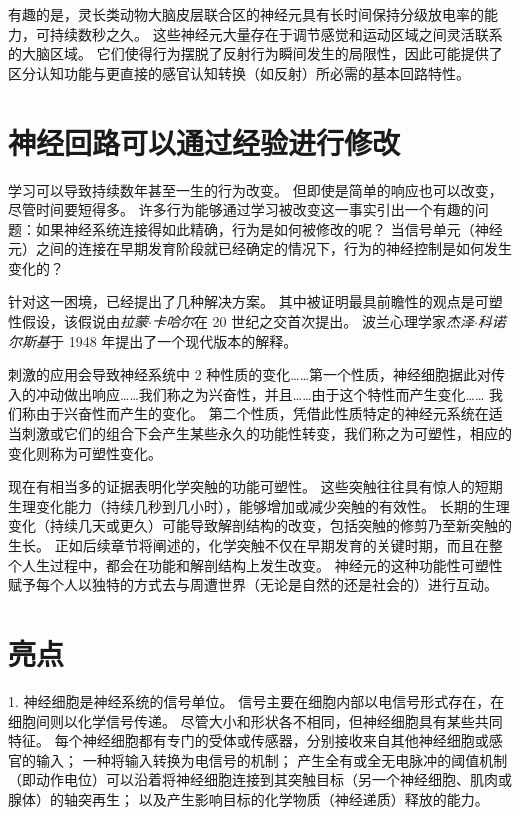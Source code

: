 有趣的是，灵长类动物大脑皮层联合区的神经元具有长时间保持分级放电率的能力，可持续数秒之久。 
这些神经元大量存在于调节感觉和运动区域之间灵活联系的大脑区域。 
它们使得行为摆脱了反射行为瞬间发生的局限性，因此可能提供了区分认知功能与更直接的感官认知转换（如反射）所必需的基本回路特性。


\section{神经回路可以通过经验进行修改}
学习可以导致持续数年甚至一生的行为改变。 
但即使是简单的响应也可以改变，尽管时间要短得多。 
许多行为能够通过学习被改变这一事实引出一个有趣的问题：如果神经系统连接得如此精确，行为是如何被修改的呢？ 
当信号单元（神经元）之间的连接在早期发育阶段就已经确定的情况下，行为的神经控制是如何发生变化的？


针对这一困境，已经提出了几种解决方案。 
其中被证明最具前瞻性的观点是可塑性假设，该假说由\textit{拉蒙$\cdot$卡哈尔}在 20 世纪之交首次提出。 
波兰心理学家\textit{杰泽$\cdot$科诺尔斯基}于 1948 年提出了一个现代版本的解释。


刺激的应用会导致神经系统中 2 种性质的变化……第一个性质，神经细胞据此对传入的冲动做出响应……我们称之为兴奋性，并且……由于这个特性而产生变化…… 我们称由于兴奋性而产生的变化。
第二个性质，凭借此性质特定的神经元系统在适当刺激或它们的组合下会产生某些永久的功能性转变，我们称之为可塑性，相应的变化则称为可塑性变化。


现在有相当多的证据表明化学突触的功能可塑性。 
这些突触往往具有惊人的短期生理变化能力（持续几秒到几小时），能够增加或减少突触的有效性。 
长期的生理变化（持续几天或更久）可能导致解剖结构的改变，包括突触的修剪乃至新突触的生长。 
正如后续章节将阐述的，化学突触不仅在早期发育的关键时期，而且在整个人生过程中，都会在功能和解剖结构上发生改变。
神经元的这种功能性可塑性赋予每个人以独特的方式去与周遭世界（无论是自然的还是社会的）进行互动。



\section{亮点}
1. 神经细胞是神经系统的信号单位。
信号主要在细胞内部以电信号形式存在，在细胞间则以化学信号传递。
尽管大小和形状各不相同，但神经细胞具有某些共同特征。
每个神经细胞都有专门的受体或传感器，分别接收来自其他神经细胞或感官的输入； 
一种将输入转换为电信号的机制；
产生全有或全无电脉冲的阈值机制（即动作电位）可以沿着将神经细胞连接到其突触目标（另一个神经细胞、肌肉或腺体）的轴突再生；
以及产生影响目标的化学物质（神经递质）释放的能力。


